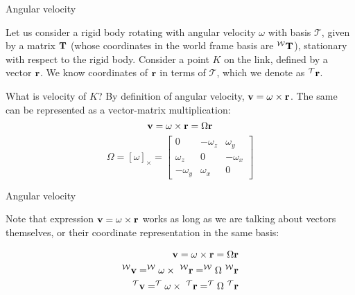 \documentclass{beamer}
\begin{document}
\begin{frame}{Angular velocity}
	\begin{flushleft}
		
		Let us consider a rigid body rotating with angular velocity $\omega$ with basis $\mathcal T$, given by a matrix $\mathbf{T}$ (whose coordinates in the world frame basis are $^{\mathcal W}\mathbf{T}$), stationary with respect to the rigid body. Consider a point $K$ on the link, defined by a vector $\mathbf{r}$. We know coordinates of $\mathbf{r}$ in terms of $\mathcal T$, which we denote as $^{\mathcal T} \mathbf{r}$.
		
		\bigskip
		
		What is velocity of $K$? By definition of angular velocity, $\mathbf{v} = \omega \times \mathbf{r}$. The same can be represented as a vector-matrix multiplication:
		\begin{equation}
			\mathbf{v} = \omega \times \mathbf{r} = \Omega \mathbf{r}
		\end{equation}
		\begin{equation}
			\Omega = [\omega]_\times = 
			\begin{bmatrix}
				0 & -\omega_z & \omega_y \\
				\omega_z & 0 & -\omega_x \\
				-\omega_y & \omega_x & 0
			\end{bmatrix}
		\end{equation}
		
	\end{flushleft}
\end{frame}



\begin{frame}{Angular velocity}
	\begin{flushleft}
		
		Note that expression  $\mathbf{v} = \omega \times \mathbf{r}$ works as long as we are talking about vectors themselves, or their coordinate representation in the same basis:
		
		\begin{align}
			\bo{v} = \omega \times \bo{r} = \Omega \bo{r} \\
			^{\mathcal W}\bo{v} = ^{\mathcal W}\omega \times \ ^{\mathcal W}\bo{r} = ^{\mathcal W}\Omega \ ^{\mathcal W}\bo{r}  \\
			^{\mathcal T}\bo{v} = ^{\mathcal T}\omega \times \ ^{\mathcal T}\bo{r} = ^{\mathcal T}\Omega \ ^{\mathcal T}\bo{r} 
		\end{align}
		
		
	\end{flushleft}
\end{frame}
\end{document}
